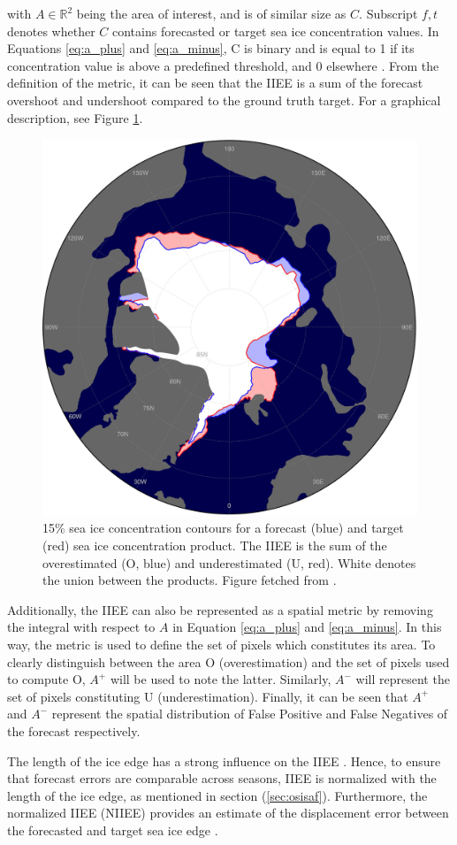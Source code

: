 \documentclass[../main/thesis.tex]{subfiles}
\begin{document}
with $A \in{\mathbb{R}^2}$ being the area of interest, and is of similar size as $C$. Subscript $f,t$ denotes whether $C$ contains forecasted or target sea ice concentration values. In Equations \ref{eq:a_plus} and \ref{eq:a_minus}, C is binary and is equal to 1 if its concentration value is above a predefined threshold, and 0 elsewhere \citep{Goessling2016}. From the definition of the metric, it can be seen that the IIEE is a sum of the forecast overshoot and undershoot compared to the ground truth target. For a graphical description, see Figure \ref{fig:goessling_iiee}.

\begin{figure}
    \centering
    \includegraphics[width=.4\textwidth]{goessling_iiee}
    \caption{\label{fig:goessling_iiee}15\% sea ice concentration contours for a forecast (blue) and target (red) sea ice concentration product. The IIEE is the sum of the overestimated (O, blue) and underestimated (U, red). White denotes the union between the products. Figure fetched from \protect\citet{Goessling2016}.}
\end{figure}

Additionally, the IIEE can also be represented as a spatial metric by removing the integral with respect to $A$ in Equation \ref{eq:a_plus} and \ref{eq:a_minus}. In this way, the metric is used to define the set of pixels which constitutes its area. To clearly distinguish between the area O (overestimation) and the set of pixels used to compute O, $A^+$ will be used to note the latter. Similarly, $A^-$ will represent the set of pixels constituting U (underestimation). Finally, it can be seen that $A^+$ and $A^-$ represent the spatial distribution of False Positive and False Negatives of the forecast respectively.

The length of the ice edge has a strong influence on the IIEE \citep{Goessling2018,Palerme2019}. Hence, to ensure that forecast errors are comparable across seasons, IIEE is normalized with the length of the ice edge, as mentioned in section (\ref{sec:osisaf}). Furthermore, the normalized IIEE (NIIEE) provides an estimate of the displacement error between the forecasted and target sea ice edge \citep{Melsom2019}.
\end{document}
